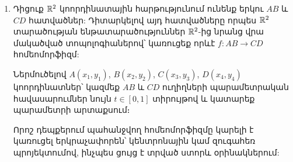 \begin{enumerate}[label=\thesection.\arabic*.]
\begin{hint}
Դիտարկեք $f: (a, b) \to (c, d), \ f(x) = c + \dfrac{d-c}{b-a}(x-a)$ ան\-ընդ\-հատ արտապատկերումը և, օգտվելով \hyperref[ch11ex1]{1}, \hyperref[ch11ex2]{2} օրինակներից, կիրառեք \hyperref[ch9thm10]{թեորեմ 10}-ը թեմա 9-ում:
\end{hint}

\item Դիցուք $\mathbb{R}^2$ կոորդինատային հարթությունում ունենք երկու $AB$ և $CD$ հատ\-ված\-ներ: Դիտարկելով այդ հատվածները որպես $\mathbb{R}^2$ տարածության ենթա\-տա\-րա\-ծու\-թյուններ $\mathbb{R}^2$-ից նրանց վրա մակածված տոպոլոգիաներով՝ կառուցեք որևէ $f: AB \to CD$ հոմեոմորֆիզմ:

\begin{hint}
Ներմուծելով $A(x_1, y_1)$, $B(x_2, y_2)$, $C(x_3, y_3)$, $D(x_4, y_4)$ կոոր\-դի\-նատ\-ներ՝ կազմեք $AB$ և $CD$ ուղիղների պարամետրական հավասարումներ նույն $t \in [0, 1]$ տիրույթով և կատարեք պարամետրի արտաքսում։

\par Որոշ դեպքերում պահանջվող հոմեոմորֆիզմը կարելի է կառուցել երկրա\-չա\-փո\-րեն՝ կենտրոնային կամ զուգահեռ պրոյեկտումով, ինչպես ցույց է տրված ստորև օրինակներում:
\end{hint}


\end{enumerate}
